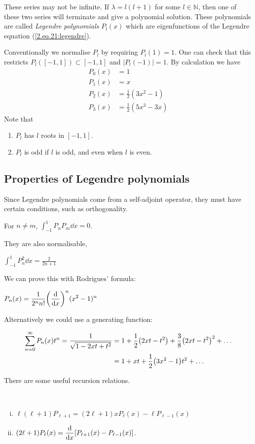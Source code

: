 \documentclass[a4paper]{article}
\begin{document}
These series may not be infinite.
If $\lambda=l(l+1)$ for some $l\in\mathbb N$, then one of these two series will terminate and give a polynomial solution.
These polynomials are called \textit{Legendre polynomials} $P_l(x)$ which are eigenfunctions of the Legendre equation (\ref{2.eq.21:legendre}).

Conventionally we normalise $P_l$ by requiring $P_l(1)=1$.
One can check that this restricts $P_l([-1,1])\subset [-1,1]$ and $|P_l(-1)|=1$.
By calculation we have
\begin{align*}
    P_{0}(x)&=1\\ 
    P_{1}(x)&=x\\ 
    P_{2}(x)&=\frac{1}{2}\left(3 x^{2}-1\right)\\ 
    P_{3}(x)&=\frac{1}{2}\left(5 x^{3}-3 x\right)
\end{align*}
Note that 
\begin{enumerate}
    \item $P_l$ has $l$ roots in $[-1,1]$.
    \item $P_l$ is odd if $l$ is odd, and even when $l$ is even.
\end{enumerate}

\subsection{Properties of Legendre polynomials}
Since Legendre polynomials come from a self-adjoint operator, they must have certain conditions, such as orthogonality.
\begin{proposition}
    For \( n \neq m \), $\displaystyle \int_{-1}^1 P_n P_m \dd{x} = 0$. 
\end{proposition}
They are also normalisable,
\begin{proposition}
    $\displaystyle 
	\int_{-1}^1 P_n^2 \dd{x} = \frac{2}{2n+1}$
\end{proposition}
We can prove this with Rodrigues' formula:
\begin{proposition}
    $\displaystyle P_n(x) = \frac{1}{2^n n!} \qty( \dv{x} )^n (x^2 - 1)^n$ 
\end{proposition}
Alternatively we could use a generating function:
\begin{proposition}
    \begin{align*}
        \sum_{n=0}^\infty P_n(x) t^n = \frac{1}{\sqrt{1 - 2xt + t^2}} & = 1 + \frac{1}{2}\qty(2xt - t^2) + \frac{3}{8}\qty(2xt - t^2)^2 + \dots \\
                                                                      & = 1 + xt + \frac{1}{2}\qty(3x^2 - 1)t^2 + \dots
    \end{align*}
\end{proposition}
There are some useful recursion relations.
\begin{proposition}\
    \begin{enumerate}[(i)]
        \item $ \ell(\ell + 1) P_{\ell + 1} = (2 \ell + 1) x P_\ell(x) - \ell P_{\ell - 1}(x) $
        \item $\displaystyle (2\ell + 1)P_\ell(x) = \dv{x} \qty[ P_{\ell + 1}(x) - P_{\ell - 1}(x) ]$.
    \end{enumerate}
\end{proposition}
\end{document}
